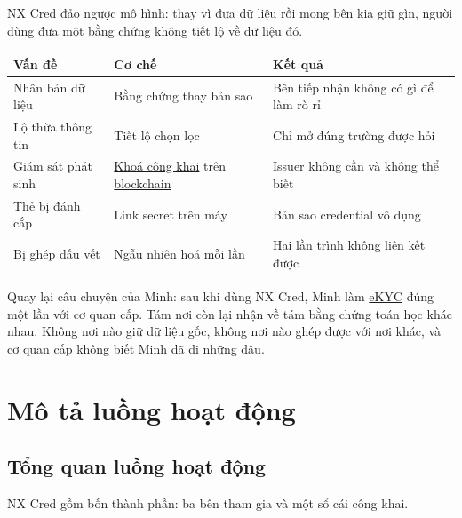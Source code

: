 \documentclass[a4paper,11pt,oneside]{report}
\theoremstyle{definition}
\theoremstyle{plain}
\newcommand{\g}[2]{\hyperref[term:#1]{#2}}
\begin{document}
NX Cred đảo ngược mô hình: thay vì đưa dữ liệu rồi mong bên kia giữ gìn, người dùng đưa một
bằng chứng không tiết lộ về dữ liệu đó.

\begin{center}
\begin{tabular}{@{}p{4.8cm}p{4.4cm}p{5.2cm}@{}}
\toprule
\textbf{\sffamily Vấn đề} & \textbf{\sffamily Cơ chế} & \textbf{\sffamily Kết quả} \\
\midrule
Nhân bản dữ liệu &
Bằng chứng thay bản sao &
Bên tiếp nhận không có gì để làm rò rỉ \\
\addlinespace
Lộ thừa thông tin &
Tiết lộ chọn lọc &
Chỉ mở đúng trường được hỏi \\
\addlinespace
Giám sát phát sinh &
\g{pubkey}{Khoá công khai} trên \g{blockchain}{blockchain} &
Issuer không cần và không thể biết \\
\addlinespace
Thẻ bị đánh cắp &
Link secret trên máy &
Bản sao credential vô dụng \\
\addlinespace
Bị ghép dấu vết &
Ngẫu nhiên hoá mỗi lần &
Hai lần trình không liên kết được \\
\bottomrule
\end{tabular}
\end{center}

Quay lại câu chuyện của Minh: sau khi dùng NX Cred, Minh làm \g{ekyc}{eKYC} đúng một lần với cơ
quan cấp. Tám nơi còn lại nhận về tám bằng chứng toán học khác nhau. Không nơi nào giữ dữ liệu
gốc, không nơi nào ghép được với nơi khác, và cơ quan cấp không biết Minh đã đi những đâu.

\chapter{Mô tả luồng hoạt động}
\label{ch:flows}

\section{Tổng quan luồng hoạt động}

NX Cred gồm bốn thành phần: ba bên tham gia và một sổ cái công khai.
\end{document}
